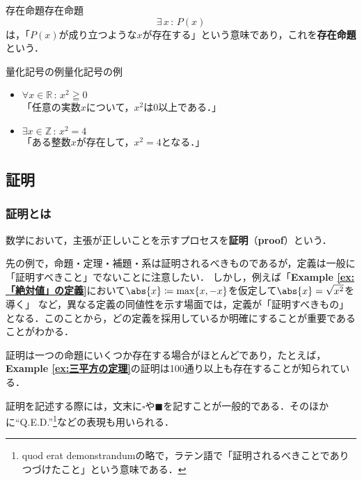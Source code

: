 \documentclass[a4paper,11pt]{ltjsarticle}
\renewcommand{\emph}[1]{\textbf{#1}}
\newcommand{\exref}[1]{{\bfseries\sffamily Example \ref{ex:#1}}}
\renewcommand{\geq}{\geqq}
\begin{document}
    \begin{definition}{存在命題}{存在命題}
        \[
        \exists \,  x\, : \, P(x)
        \]
        は，「$P(x)$が成り立つような$x$が存在する」という意味であり，これを\emph{存在命題}という．
    \end{definition}
    
    \begin{example}{量化記号の例}{量化記号の例}
        \begin{itemize}
            \item $\forall x \in \mathbb{R}\, : \, x^2 \geq 0$\\
            「任意の実数$x$について，$x^2$は$0$以上である．」
            \item $\exists x \in \mathbb{Z} \, : \, x^2 = 4$\\
            「ある整数$x$が存在して，$x^2 = 4$となる．」
        \end{itemize}
    \end{example}

    \subsection{証明}

    \subsubsection{証明とは}
    数学において，主張が正しいことを示すプロセスを\emph{証明}（\emph{proof}）という．
    
    先の例で，命題・定理・補題・系は証明されるべきものであるが，定義は一般に「証明すべきこと」でないことに注意したい．
    しかし，例えば「\exref{「絶対値」の定義}において$\abs{x} \coloneqq \max \{ x, -x \}$を仮定して$\abs{x} = \sqrt{x^2}$を導く」
    など，異なる定義の同値性を示す場面では，定義が「証明すべきもの」となる．このことから，どの定義を採用しているか明確にすることが重要であることがわかる．

    証明は一つの命題にいくつか存在する場合がほとんどであり，たとえば，\exref{三平方の定理}の証明は100通り以上も存在することが知られている．
    
    証明を記述する際には，文末に$\square$や$\blacksquare$を記すことが一般的である．そのほかに``Q.E.D.''\footnote{quod erat demonstrandumの略で，ラテン語で「証明されるべきことでありつづけたこと」という意味である．}などの表現も用いられる．
    
\end{document}
